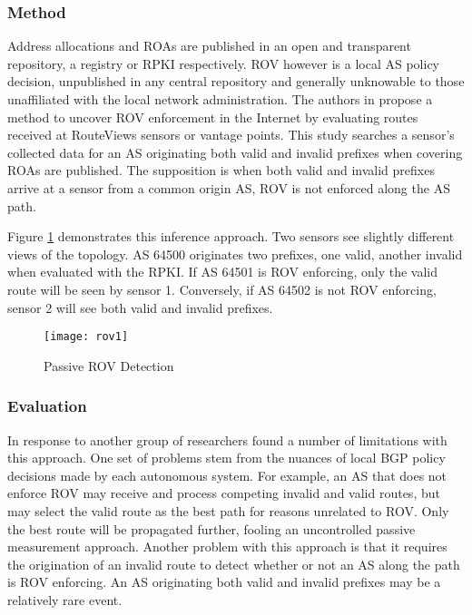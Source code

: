 \documentclass[sigconf]{acmart}
\begin{document}
\subsubsection{Method}

Address allocations and ROAs are published in an open and transparent
repository, a registry or RPKI respectively.  ROV however is a local AS
policy decision, unpublished in any central repository and generally
unknowable to those unaffiliated with the local network administration.
The authors in \cite{gilad_are_2017} propose a method to uncover ROV
enforcement in the Internet by evaluating routes received at RouteViews
sensors or vantage points.  This study searches a sensor's collected
data for an AS originating both valid and invalid prefixes when covering
ROAs are published.  The supposition is when both valid and invalid
prefixes arrive at a sensor from a common origin AS, ROV is not enforced
along the AS path.

Figure \ref{fig:rov1} demonstrates this inference approach.  Two sensors
see slightly different views of the topology.  AS 64500 originates two
prefixes, one valid, another invalid when evaluated with the RPKI.  If
AS 64501 is ROV enforcing, only the valid route will be seen by sensor
1.  Conversely, if AS 64502 is not ROV enforcing, sensor 2 will see both
valid and invalid prefixes.

\begin{figure}
  \centering
    \texttt{[image: rov1]}
  \caption{Passive ROV Detection}
  \label{fig:rov1}
\end{figure}

\subsubsection{Evaluation}

In response to \cite{gilad_are_2017} another group of researchers found
a number of limitations with this approach.\cite{reuter_towards_2018}
One set of problems stem from the nuances of local BGP policy decisions
made by each autonomous system.  For example, an AS that does not
enforce ROV may receive and process competing invalid and valid routes,
but may select the valid route as the best path for reasons unrelated to
ROV.  Only the best route will be propagated further, fooling an
uncontrolled passive measurement approach.  Another problem with this
approach is that it requires the origination of an invalid route to
detect whether or not an AS along the path is ROV enforcing.  An AS
originating both valid and invalid prefixes may be a relatively rare
event.
\end{document}
